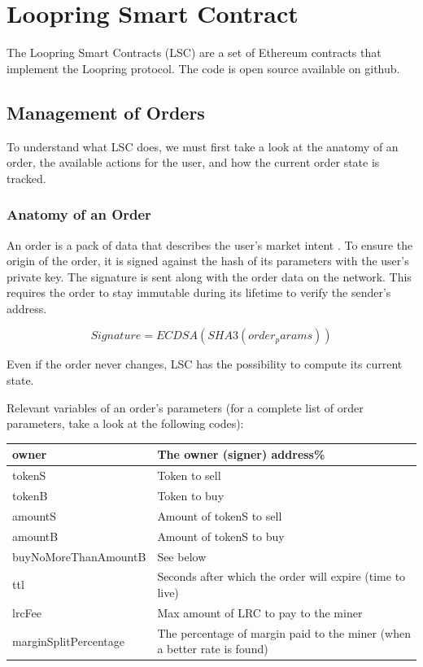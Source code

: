 \documentclass[UTF8,nofonts]{article}
\begin{document}
\section{Loopring Smart Contract}
The Loopring Smart Contracts (LSC) are a set of Ethereum contracts that implement the Loopring protocol. The code is open source available on github.


\subsection{Management of Orders}

To understand what LSC does, we must first take a look at the anatomy of an order, the available actions for the user, and how the current order state is tracked.
\subsubsection{Anatomy of an Order}

An order is a pack of data that describes the user’s market intent . To ensure the origin of the order, it is signed against the hash of its parameters with the user's private key. The signature is sent along with the order data on the network. This requires the order to stay immutable during its lifetime to verify the sender's address.


\begin{equation}
Signature = ECDSA(SHA3(order_params))
\end{equation}

Even if the order never changes, LSC has the possibility to compute its current state.

Relevant variables of an order's parameters (for a complete list of order parameters, take a look at the following codes):

\begin{table}[hbt]
 \centering
\begin{tabular}{p{4cm}|p{10cm}} %
owner & The owner (signer) address\%\\
\hline
tokenS & Token to sell\\
\hline
tokenB & Token to buy\\
\hline
amountS & Amount of tokenS to sell\\
\hline
amountB &Amount of tokenS to buy\\
\hline
buyNoMoreThanAmountB &See below\\
\hline
ttl &Seconds after which the order will expire (time to live)\\
\hline
lrcFee &Max amount of LRC to pay to the miner\\
\hline
marginSplitPercentage & The percentage of margin paid to the miner (when a better rate is found)\\
 \end{tabular}
\end{table}
\end{document}
